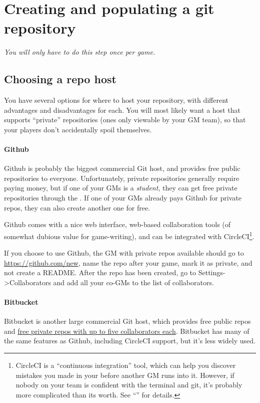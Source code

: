 \documentclass[green]{testgame}
\begin{document}
\section{Creating and populating a git repository}

{\em You will only have to do this step once per game.}

\subsection{Choosing a repo host}

You have several options for where to host your repository, with different advantages and disadvantages for each. You will most likely want a host that supports ``private'' repositories (ones only viewable by your GM team), so that your players don't accidentally spoil themselves.

\paragraph*{Github} Github is probably the biggest commercial Git host, and provides free public repositories to everyone. Unfortunately, private repositories generally require paying money, but if one of your GMs is a \emph{student}, they can get free private repositories through the . If one of your GMs already pays Github for private repos, they can also create another one for free.

Github comes with a nice web interface, web-based collaboration tools (of somewhat dubious value for game-writing), and can be integrated with CircleCI\footnote{CircleCI is a ``continuous integration'' tool, which can help you discover mistakes you made in your \gametex{} before another GM runs into it. However, if nobody on your team is confident with the terminal and git, it's probably more complicated than its worth. See ``\gCI{}'' for details. }.

If you choose to use Github, the GM with private repos available should go to \url{https://github.com/new}, name the repo after your game, mark it as private, and not create a README. After the repo has been created, go to Settings->Collaborators and add all your co-GMs to the list of collaborators.

\paragraph*{Bitbucket} Bitbucket is another large commercial Git host, which provides free public repos and \href{https://bitbucket.org/product/pricing/}{free private repos with up to five collaborators each}. Bitbucket has many of the same features as Github, including CircleCI support, but it's less widely used.
\end{document}
